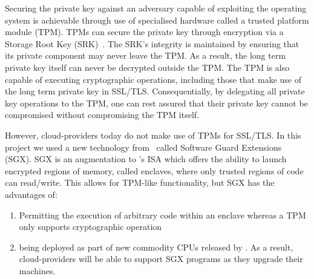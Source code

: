 \documentclass[../main.tex]{subfiles}
\begin{document}
Securing the private key against an adversary capable of exploiting
the operating system is achievable through use of specialised hardware
called a trusted platform module (TPM). TPMs can secure the private
key through encryption via a Storage Root Key (SRK)~\cite{tpm10}. The
SRK's integrity is maintained by ensuring that its private component
may never leave the TPM. As a result, the long term private key itself
can never be decrypted outside the TPM. The TPM is also capable of
executing cryptographic operations, including those that make use of
the long term private key in SSL/TLS. Consequentially, by delegating
all private key operations to the TPM, one can rest assured that their
private key cannot be compromised without compromising the TPM itself.

However, cloud-providers today do not make use of TPMs for SSL/TLS. In
this project we used a new technology from \Intel~called Software
Guard Extensions (SGX). SGX is an augmentation to \Intel's ISA which
offers the ability to launch encrypted regions of memory, called
enclaves, where only trusted regions of code can read/write. This
allows for TPM-like functionality, but SGX has the advantages of:
\begin{enumerate}
  \item Permitting the execution of arbitrary code within an enclave whereas a
    TPM only supports cryptographic operation
  \item being deployed as part of new commodity CPUs released by \Intel.
    As a result, cloud-providers will be able to support SGX programs
    as they upgrade their machines.
\end{enumerate}

\end{document}
